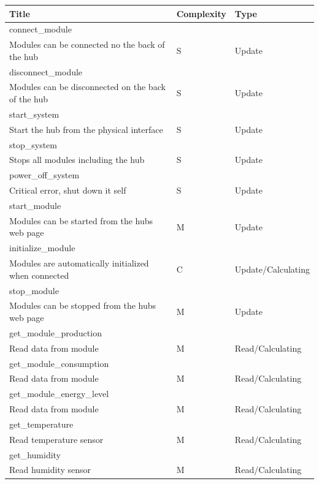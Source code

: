 \begin{table}[H]
	\begin{tabular}{| p{11cm} | p{2cm} | p{3cm} |}
	\hline
	\textbf{Title}								& \textbf{Complexity}	& \textbf{Type}		\\ \hline
	connect\_module							&&
	\\ Modules can be connected no the back of the hub	& S				& Update 			\\ \hline
	disconnect\_module							&&
	\\ Modules can be disconnected on the back of the hub & S			& Update	 		\\ \hline
	start\_system								&&
	\\ Start the hub from the physical interface			 & S				& Update 			\\ \hline
	stop\_system								&&
	\\ Stops all modules including the hub & S		& Update 			\\ \hline
	power\_off\_system							&&
	\\ Critical error, shut down it self				& S				& Update 			\\ \hline
	start\_module								&&
	\\ Modules can be started from the hubs web page & M				& Update 			\\ \hline
	initialize\_module							&&
	\\ Modules are automatically initialized when connected & C			& Update/Calculating\\ \hline
	stop\_module								&&
	\\ Modules can be stopped from the hubs web page	& M				& Update 			\\ \hline
	get\_module\_production						&&
	\\ Read data from module						& M				& Read/Calculating 	\\ \hline
	get\_module\_consumption					&&
	\\ Read data from module						& M				& Read/Calculating 	\\ \hline
	get\_module\_energy\_level					&&
	\\ Read data from module						& M				& Read/Calculating 	\\ \hline
	get\_temperature							&&
	\\ Read temperature sensor					& M				& Read/Calculating	\\ \hline
	get\_humidity								&&
	\\ Read humidity sensor						& M				& Read/Calculating	\\ \hline

\end{tabular}
\end{table}
